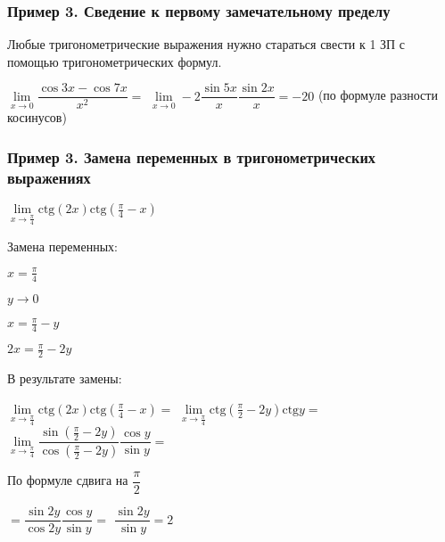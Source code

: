 \subsubsection{Пример 3. Сведение к первому замечательному пределу}

Любые тригонометрические выражения нужно стараться свести к
1 ЗП с помощью тригонометрических формул.

$ \lim\limits_{x\to 0} \dfrac{ \cos{3x} - \cos{7x}}{x^{2}} = $
$ \lim\limits_{x\to 0} -2 \dfrac{\sin{5x}}{x} \dfrac{\sin{2x}}{x} = -20 $
(по формуле разности косинусов)

\subsubsection{Пример 3. Замена переменных в тригонометрических выражениях}

$ \lim\limits_{x\to \frac{\pi}{4} } \mathrm{ctg}(2x)  \mathrm{ctg}( \frac{\pi}{4} - x)  $

Замена переменных:

$ x = \frac{\pi}{4} $

$ y \to 0 $

$ x = \frac{\pi}{4} - y $

$ 2x = \frac{\pi}{2} - 2y $

В результате замены:

$ \lim\limits_{x\to \frac{\pi}{4} } \mathrm{ctg}(2x)  \mathrm{ctg}( \frac{\pi}{4} - x) = $
$ \lim\limits_{x\to \frac{\pi}{4} } \mathrm{ctg}(\frac{\pi}{2} - 2y)  \mathrm{ctg}{y} = $
$ \lim\limits_{x\to \frac{\pi}{4} } 
\dfrac{\sin(\frac{\pi}{2} - 2y)}{\cos(\frac{\pi}{2} - 2y)}
\dfrac{\cos{y} }{\sin{y} } = $

По формуле сдвига на $ \dfrac{\pi}{2} $ 

$ = \dfrac{\sin{2y} }{\cos{2y} } \dfrac{\cos{y} }{\sin{y} } = $
$ \dfrac{\sin{2y} }{\sin{y} } = 2 $
